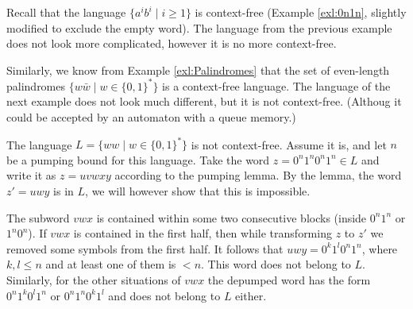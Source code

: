 \begin{page}
\setcounter{section}{7}
\setcounter{subsection}{2}
\setcounter{dfn}{4}
\label{portion:1303}


Recall that the language $\{a^ib^i \mid i \ge 1\}$ is context-free (Example \ref{exl:0n1n}, slightly modified to exclude the empty word).
The language from the previous example does not look more complicated, however it is no more context-free.

Similarly, we know from Example \ref{exl:Palindromes} that the set of even-length palindromes $\{w \bar{w} \mid w \in \{0,1\}^*\}$
is a context-free language.
The language of the next example does not look much different, but it is not context-free.
(Althoug it could be accepted by an automaton with a queue memory.)


\end{page}

\begin{page}
\setcounter{section}{7}
\setcounter{subsection}{2}
\setcounter{dfn}{5}
\label{portion:1305}

\begin{exl}
\label{exl:WW}
The language $L = \{ww \mid w \in \{0,1\}^*\}$ is not context-free.
Assume it is, and let $n$ be a pumping bound for this language.
Take the word $z = 0^n1^n0^n1^n \in L$ and write it as $z = uvwxy$ according to the pumping lemma.
By the lemma, the word $z' = uwy$ is in $L$, we will however show that this is impossible.

The subword $vwx$ is contained within some two consecutive blocks (inside $0^n1^n$ or $1^n0^n$).
If $vwx$ is contained in the first half, then while transforming $z$ to $z'$ we removed some symbols from the first half.
It follows that $uwy = 0^k1^l0^n1^n$, where $k, l \le n$ and at least one of them is $<n$.
This word does not belong to $L$.
Similarly, for the other situations of $vwx$ the depumped word has the form $0^n1^k0^l1^n$ or $0^n1^n0^k1^l$ and does not belong to $L$ either.
\end{exl}

\end{page}

